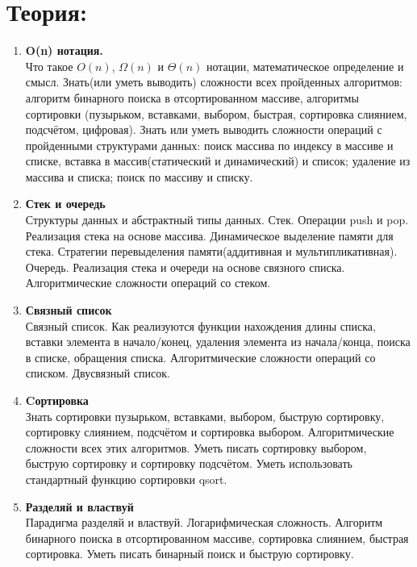 \documentclass{article}
\begin{document}

\section*{Теория:}
\begin{enumerate}

\item  \textbf{O(n) нотация.}\\
Что такое $O(n)$, $\Omega(n)$ и $\Theta(n)$ нотации, математическое определение и смысл.
Знать(или уметь выводить) сложности всех пройденных алгоритмов: алгоритм бинарного поиска в отсортированном массиве, алгоритмы сортировки (пузырьком, вставками, выбором, быстрая, сортировка слиянием, подсчётом, цифровая). Знать или уметь выводить сложности операций с пройденными структурами данных: поиск массива по индексу в массиве и списке, вставка в массив(статический и динамический) и список; удаление из массива и списка; поиск по массиву и списку.\\

\item  \textbf{Стек и очередь}\\
Структуры данных и абстрактный типы данных. Стек. Операции push и pop. Реализация стека на основе массива. Динамическое выделение памяти для стека. Стратегии перевыделения памяти(аддитивная и мультипликативная).  Очередь. Реализация стека и очереди на основе связного списка. Алгоритмические сложности операций со стеком.\\

\item \textbf{Связный список}\\
Связный список. Как реализуются функции нахождения длины списка, вставки элемента в начало/конец, удаления элемента из начала/конца, поиска в списке, обращения списка. Алгоритмические сложности операций со списком. Двусвязный список.\\


\item \textbf{Cортировка}\\
Знать сортировки пузырьком, вставками, выбором, быструю сортировку, сортировку слиянием, подсчётом и сортировка выбором. Алгоритмические сложности всех этих алгоритмов. Уметь писать сортировку выбором, быструю сортировку и сортировку подсчётом. Уметь использовать стандартный функцию сортировки qsort.\\

\item \textbf{Разделяй и властвуй}\\
Парадигма разделяй и властвуй. Логарифмическая сложность. Алгоритм бинарного поиска в отсортированном массиве, сортировка слиянием, быстрая сортировка. Уметь писать бинарный поиск и быструю сортировку.\\


\end{enumerate}
\end{document}
